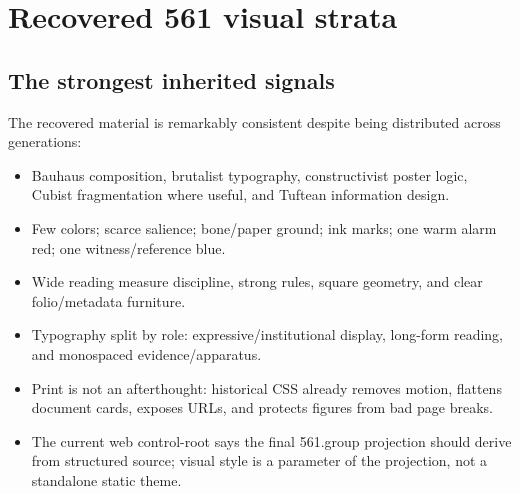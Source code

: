 \documentclass[11pt,twoside,openany]{report}
\begin{document}
\clearpage
\chapter{Recovered 561 visual strata}

\section{The strongest inherited signals}
The recovered material is remarkably consistent despite being distributed across generations:
\begin{itemize}
  \item Bauhaus composition, brutalist typography, constructivist poster logic, Cubist fragmentation where useful, and Tuftean information design.
  \item Few colors; scarce salience; bone/paper ground; ink marks; one warm alarm red; one witness/reference blue.
  \item Wide reading measure discipline, strong rules, square geometry, and clear folio/metadata furniture.
  \item Typography split by role: expressive/institutional display, long-form reading, and monospaced evidence/apparatus.
  \item Print is not an afterthought: historical CSS already removes motion, flattens document cards, exposes URLs, and protects figures from bad page breaks.
  \item The current web control-root says the final 561.group projection should derive from structured source; visual style is a parameter of the projection, not a standalone static theme.
\end{itemize}
\end{document}
